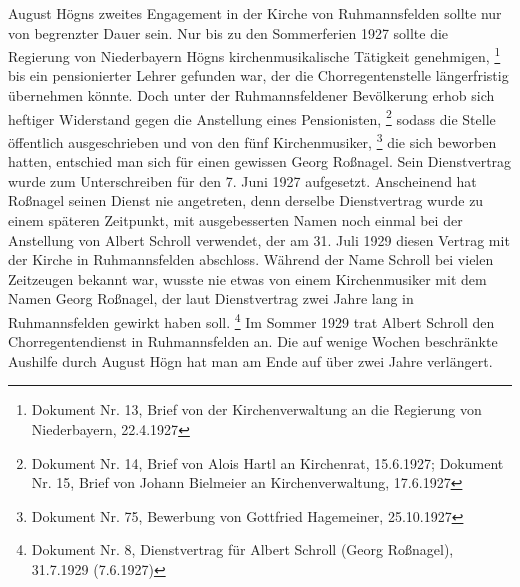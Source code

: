 August Högns zweites Engagement in der Kirche von Ruhmannsfelden sollte
nur von begrenzter Dauer sein. Nur bis zu den Sommerferien 1927 sollte
die Regierung von Niederbayern Högns kirchenmusikalische Tätigkeit
genehmigen, \footnote{Dokument Nr. 13, Brief von der Kirchenverwaltung
an die Regierung von Niederbayern, 22.4.1927} bis ein pensionierter
Lehrer gefunden war, der die Chorregentenstelle längerfristig
übernehmen könnte. Doch unter der Ruhmannsfeldener Bevölkerung erhob
sich heftiger Widerstand gegen die Anstellung eines
Pensionisten, \footnote{Dokument Nr. 14, Brief von Alois Hartl an
Kirchenrat, 15.6.1927; Dokument Nr. 15, Brief von Johann Bielmeier an
Kirchenverwaltung, 17.6.1927} sodass die Stelle öffentlich
ausgeschrieben und von den fünf Kirchenmusiker, \footnote{Dokument Nr.
75, Bewerbung von Gottfried Hagemeiner, 25.10.1927} die sich beworben
hatten, entschied man sich für einen gewissen Georg Roßnagel. Sein
Dienstvertrag wurde zum Unterschreiben für den 7. Juni 1927 aufgesetzt.
Anscheinend hat Roßnagel seinen Dienst nie angetreten, denn derselbe
Dienstvertrag wurde zu einem späteren Zeitpunkt, mit ausgebesserten
Namen noch einmal bei der Anstellung von Albert Schroll verwendet, der
am 31. Juli 1929 diesen Vertrag mit der Kirche in Ruhmannsfelden
abschloss. Während der Name Schroll bei vielen Zeitzeugen bekannt war,
wusste nie etwas von einem Kirchenmusiker mit dem Namen Georg Roßnagel,
der laut Dienstvertrag zwei Jahre lang in Ruhmannsfelden gewirkt haben
soll. \footnote{Dokument Nr. 8, Dienstvertrag für Albert Schroll (Georg
Roßnagel), 31.7.1929 (7.6.1927)} Im Sommer 1929 trat Albert Schroll den
Chorregentendienst in Ruhmannsfelden an. Die auf wenige Wochen
beschränkte Aushilfe durch August Högn hat man am Ende auf über zwei
Jahre verlängert.

